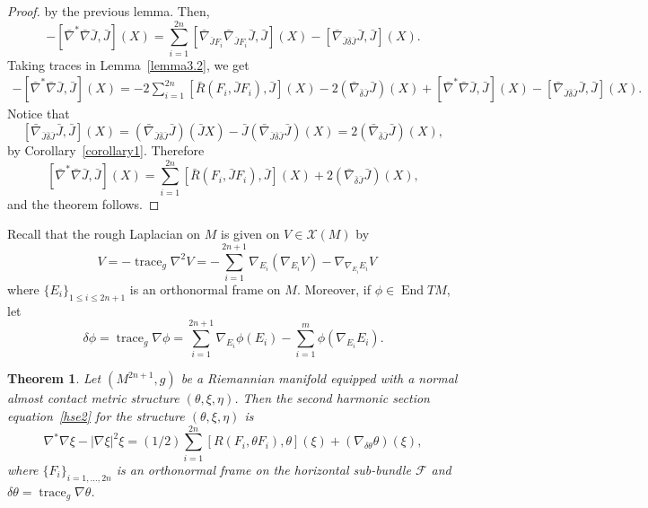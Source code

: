 \documentclass[a4paper,reqno]{amsart}
\newtheorem{theorem}[thm]{Theorem}
\theoremstyle{definition}
\theoremstyle{remark}
\theoremstyle{plain}
\numberwithin{equation}{section}
\newcommand{\calX}{{\mathcal{X}}}
\def\End{\operatorname {End}}
\DeclareMathOperator{\trace}{{trace}}
\DeclareMathOperator{\rough}{{\nabla^*\nabla}}
\newcommand{\f}{\mathcal{F}}
\begin{document}
\begin{proof}
by the previous lemma. Then,
$$-[\bar{\nabla}^*\bar{\nabla}\bar{J}
,\bar{J}](X)=\sum_{i=1}^{2n}[\bar{\nabla}_{\bar{J}F_i}\bar{\nabla}_{\bar{J}F_i}\bar{J},\bar{J}](X)
- [\bar{\nabla}_{\bar{J}\bar{\delta} \bar{J}}\bar{J},\bar{J} ](X).$$ 
Taking traces in Lemma~\ref{lemma3.2}, we get
\begin{align*}
-[\bar{\nabla}^*\bar{\nabla}\bar{J} , \bar{J}] (X)
=  -2\sum_{i=1}^{2n}[\bar{R}(F_i,\bar{J}F_i),\bar{J}](X) - 2 (\bar{\nabla}_{\bar{\delta}\bar{J}}\bar{J})(X)+[\bar{\nabla}^*\bar{\nabla} \bar{J} , \bar{J}](X) 
-[ \bar{\nabla}_{\bar{J}\bar{\delta} \bar{J}}\bar{J},\bar{J}](X).
\end{align*}
Notice that
$$[ \bar{\nabla}_{\bar{J}\bar{\delta} \bar{J}}\bar{J},\bar{J}](X) =
(\bar{\nabla}_{\bar{J}\bar{\delta}
  \bar{J}}\bar{J})(\bar{J}X)-\bar{J}(\bar{\nabla}_{\bar{J}\bar{\delta} \bar{J}}\bar{J})(X) 
= 2 (\bar{\nabla}_{\bar{\delta} \bar{J}}\bar{J})  (X),$$ 
by Corollary~\ref{corollary1}.
Therefore
$$[\bar{\nabla}^*\bar{\nabla}\bar{J} , \bar{J}]
(X)=\sum_{i=1}^{2n}[\bar{R}(F_i,\bar{J}F_i),\bar{J}](X)+ 2
(\bar{\nabla}_{\bar{\delta}\bar{J}}\bar{J})(X),$$
and the theorem follows.
\end{proof}

Recall %
that the rough Laplacian on $M$ is
given on $V \in \calX(M)$ by
\begin{equation} \label{laplacian}
\rough V=  - \trace_{g} \nabla^2 V=
  -\sum_{i=1}^{2n+1}  \nabla_{E_i}(\nabla_{E_i}V) -
  \nabla_{\nabla_{E_i}E_i}V
\end{equation}
where $\{E_i\}_{1 \le i \le 2n+1}$ is an orthonormal frame on $M$.  Moreover, if
$\phi \in \End TM$, let
\begin{equation} \label{deltatheta}
\delta\phi = \trace_{g} \nabla \phi = \sum_{i=1}^{2n+1}
  \nabla_{E_i} \phi(E_i) - \sum_{i=1}^m \phi(\nabla_{E_i} E_i).
\end{equation}


\begin{theorem} \label{thm3.2} Let $(M^{2n+1},g)$ be a Riemannian
  manifold equipped with a normal almost contact metric structure
  $(\theta,\xi,\eta)$. Then the second harmonic section
  equation~\eqref{hse2} for the structure $(\theta,\xi,\eta)$ is
  $$
  \nabla^{*}\nabla \xi - |\nabla\xi|^2\xi=
  (1/2)\sum_{i=1}^{2n}[R(F_i,\theta  F_i),\theta ] (\xi)+
  (\nabla_{\delta \theta} \theta) (\xi),
  $$
where $\{F_i\}_{i=1,\dots, 2n}$ is an orthonormal frame on the
horizontal sub-bundle $\f$ and $\delta\theta=\trace_g \nabla
\theta $. 
\end{theorem} 
\end{document}
